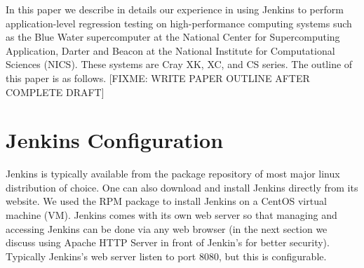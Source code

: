 \documentclass[10pt, conference, compsocconf]{IEEEtran}
\begin{document}
In this paper we describe in details our experience in using Jenkins to perform application-level regression testing on high-performance computing systems such as the Blue Water supercomputer at the National Center for Supercomputing Application, Darter and Beacon at the National Institute for Computational Sciences (NICS). These systems are Cray XK, XC, and CS series. The outline of this paper is as follows. [FIXME: WRITE PAPER OUTLINE AFTER COMPLETE DRAFT]


\section{Jenkins Configuration}
\label{sec:JenkinsConfiguration}


Jenkins is typically available from the package repository of most major linux distribution of choice. One can also download and install Jenkins directly from its website. We used the RPM package to install Jenkins on a CentOS virtual machine (VM). Jenkins comes with its own web server so that managing and accessing Jenkins can be done via any web browser (in the next section we discuss using Apache HTTP Server in front of Jenkin's for better security). Typically Jenkins's web server listen to port 8080, but this is configurable. 
\end{document}
